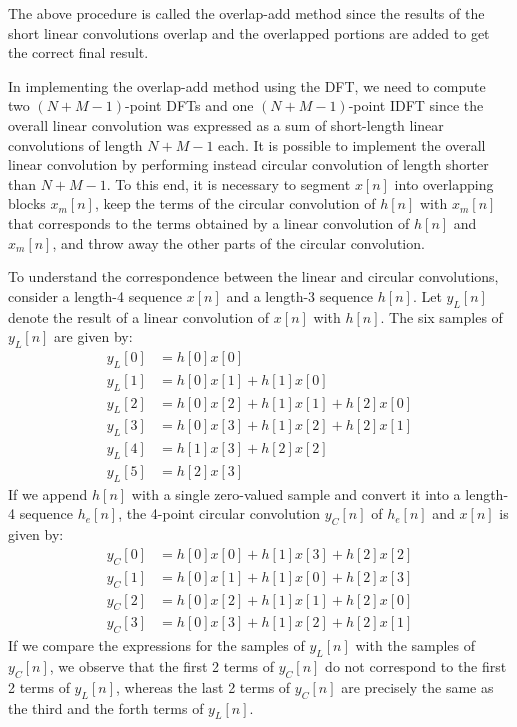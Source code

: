 \documentclass[../../main/main.tex]{subfiles}
\begin{document}
The above procedure is called the overlap-add method since the results of the short linear convolutions overlap and the overlapped portions are added to get the correct final result.

In implementing the overlap-add method using the DFT, we need to compute two \( (N+ M - 1) \)-point DFTs and one \( (N + M - 1) \)-point IDFT since the overall linear convolution was expressed as a sum of short-length linear convolutions of length \( N + M - 1 \) each. It is possible to implement the overall linear convolution by performing instead circular convolution of length shorter than \( N + M - 1 \).
To this end, it is necessary to segment \( x[n] \) into overlapping blocks \( x_{m}[n] \), keep the terms of the circular convolution of \( h[n] \) with \( x_{m}[n] \) that corresponds to the terms obtained by a linear convolution of \( h[n] \) and \( x_{m}[n] \), and throw away the other parts of the circular convolution.

To understand the correspondence between the linear and circular convolutions, consider a length-4 sequence \( x[n] \) and a length-3 sequence \( h[n] \). Let \( y_{L}[n] \) denote the result of a linear convolution of \( x[n] \) with \( h[n] \). The six samples of \( y_{L}[n] \) are given by:
\begin{align}
    y_{L}[0] &= h[0]x[0]    \\
    y_{L}[1] &= h[0]x[1] + h[1]x[0] \\
    y_{L}[2] &= h[0]x[2] + h[1]x[1] + h[2]x[0]  \\
    y_{L}[3] &= h[0]x[3] + h[1]x[2] + h[2]x[1]  \\
    y_{L}[4] &= h[1]x[3] + h[2]x[2] \\
    y_{L}[5] &= h[2]x[3]
\end{align}
If we append \( h[n] \) with a single zero-valued sample and convert it into a length-4 sequence \( h_{e}[n] \), the 4-point circular convolution \( y_{C}[n] \) of \( h_{e}[n] \) and \( x[n] \) is given by:
\begin{align}
    y_{C}[0] &= h[0]x[0] + h[1]x[3] + h[2]x[2]  \\
    y_{C}[1] &= h[0]x[1] + h[1]x[0] + h[2]x[3]  \\
    y_{C}[2] &= h[0]x[2] + h[1]x[1] + h[2]x[0]  \\
    y_{C}[3] &= h[0]x[3] + h[1]x[2] + h[2]x[1]
\end{align}
If we compare the expressions for the samples of \( y_{L}[n] \) with the samples of \( y_{C}[n] \), we observe that the first 2 terms of \( y_{C}[n] \) do not correspond to the first 2 terms of \( y_{L}[n] \), whereas the last 2 terms of \( y_{C}[n] \) are precisely the same as the third and the forth terms of \( y_{L}[n] \).
\end{document}
